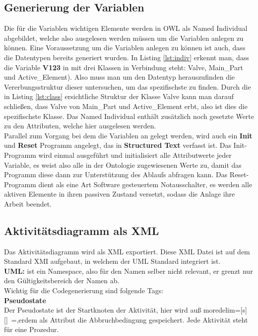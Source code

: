 \subsection{Generierung der Variablen}
Die für die Variablen wichtigen Elemente werden in OWL als Named Individual abgebildet, welche also ausgelesen werden müssen um die Variablen anlegen zu können. Eine Voraussetzung um die Variablen anlegen zu können ist auch, dass die Datentypen bereits generiert wurden. In Listing \ref{lst:indiv} erkennt man, dass die Variable \textbf{V123} in mit drei Klassen in Verbindung steht: Valve, Main\_Part und Active\_Element). Also muss man um den Datentyp herauszufinden die Vererbungsstruktur dieser untersuchen, um das spezifischste zu finden. Durch die in Listing \ref{lst:class} ersichtliche Struktur der Klasse Valve kann man darauf schließen, dass Valve von Main\_Part und Active\_Element erbt, also ist dies die spezifischste Klasse. Das Named Individual enthält zusätzlich noch gesetzte Werte zu den Attributen, welche hier ausgelesen werden.\\

Parallel zum Vorgang bei dem die Variablen an gelegt werden, wird auch ein \textbf{Init} und \textbf{Reset} Programm angelegt, das in \textbf{Structured Text} verfasst ist. Das Init-Programm wird einmal ausgeführt und initialisiert alle Attributwerte jeder Variable, es weist also alle in der Ontologie zugewiesenen Werte zu, damit das Programm diese dann zur Unterstützung des Ablaufs abfragen kann. Das Reset-Programm dient als eine Art Software gesteuertem Notausschalter, es werden alle aktiven Elemente in ihren passiven Zustand versetzt, sodass die Anlage ihre Arbeit beendet.

\subsection{Aktivitätsdiagramm als XML}
Das Aktivitätsdiagramm wird als XML exportiert. Diese XML Datei ist auf dem Standard XMI aufgebaut, in welchem der UML Standard integriert ist.\\

\textbf{UML:} ist ein Namespace, also für den Namen selber nicht relevant, er grenzt nur den Gültigkeitsbereich der Namen ab.\\

Wichtig für die Codegenerierung sind folgende Tags:\\

\textbf{Pseudostate}\\
Der Pseudostate ist der Startknoten der Aktivität, hier wird auß
  moredelim=[s][\color{Red}]{\ }{=},erdem als Attribut die Abbruchbedingung gespeichert. Jede Aktivität steht für eine Prozedur.\\


